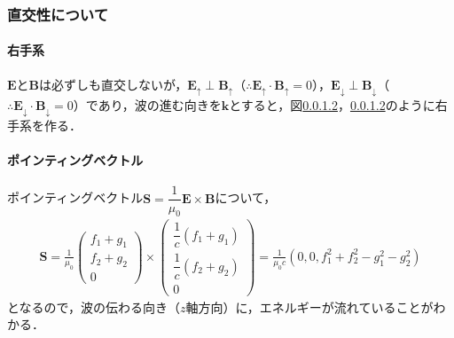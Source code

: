 %
\subsubsection{直交性について}
\paragraph{右手系}
${\bm{E}}$と${\bm{B}}$は必ずしも直交しないが，${\bm{E}}_{{\uparrow}}\perp{\bm{B}}_{{\uparrow}}$（$\therefore{\bm{E}}_{{\uparrow}}\cdot{\bm{B}}_{{\uparrow}}=0$），${\bm{E}}_{{\downarrow}}\perp{\bm{B}}_{{\downarrow}}$（$\therefore{\bm{E}}_{{\downarrow}}\cdot{\bm{B}}_{{\downarrow}}=0$）であり，波の進む向きを${\bm{k}}$とすると，図\ref{}，\ref{}のように右手系を作る．

















%
\paragraph{ポインティングベクトル}
ポインティングベクトル$\bm{S}=\dfrac{1}{\mu_0}{\bm{E}}\times{\bm{B}}$について，
\begin{align}
\bm{S}=\frac{1}{\mu_0}
\left(
    \begin{array}{c}
      f_1+g_1 \\[10pt]
      f_2+g_2 \\[10pt]
      0
    \end{array}
  \right)
  \times
  \left(
    \begin{array}{c}
      \dfrac{1}{c}(f_1+g_1) \\[10pt]
      \dfrac{1}{c}(f_2+g_2) \\[10pt]
      0
    \end{array}
  \right)
  =\frac{1}{\mu_0c}\left(0,0,f_1^2+f_2^2-g_1^2-g_2^2\right)
\end{align}
となるので，波の伝わる向き（$z$軸方向）に，エネルギーが流れていることがわかる．



















